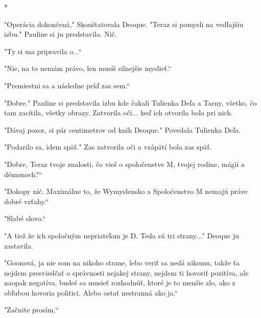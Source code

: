\documentclass{book}
\begin{document}
\begin{center}
*
\end{center}

"$ $Operácia dokončená,"$ $ Skonštatovala Deoque. "Teraz si pomysli na vedľajšiu izbu."$ $ Pauline si ju predstavila. Nič.

"Ty si ma pripravila o...“

"Nie, na to nemám právo, len musíš silnejšie myslieť.“

"Premiestni sa a následne príď zas sem.“

"Dobre."$ $ Pauline si predstavila izbu kde čakali Tulienka Deľa a Tarny, všetko, čo tam zacítila, všetky obrazy. Zatvorila oči... keď ich otvorila bola pri nich.

"Dávaj pozor, si pár centimetrov od kníh Deoque."$ $ Povedala Tulienka Deľa.

"Podarilo sa, idem späť."$ $ Zas zatvorila oči a vzápätí bola zas späť.

"Dobre, Teraz tvoje znalosti, čo vieš o spoločenstve M, tvojej rodine, mágii a démonoch?“

"Dokopy nič. Maximálne to, že Wymyslensko a Spoločenstvo M nemajú práve dobré vzťahy.“

"Slabé slovo.“

"$ $A tiež že ich spoločným nepriateľom je D. Teda sú tri strany..."$ $ Deoque ju zastavila.

"Goonová, ja nie som na nikoho strane, lebo veriť sa nedá nikomu, takže ťa nejdem presviedčať o správnosti nejakej strany, nejdem ti hovoriť pozitíva, ale naopak negatíva, budeš sa musieť rozhodnúť, ktoré je to menšie zlo, ako z obľubou hovoria politici. Alebo ostať nestranná ako ja.“

"Začnite prosím,“
\end{document}
